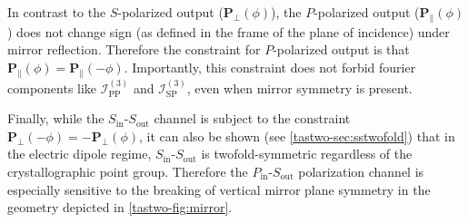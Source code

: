 \begin{table}
\caption[Indicators of broken mirror symmetry in RA-SHG]{Indicators of broken mirror symmetry in mirror-symmetry-breaking transitions between noncentrosymmetric point groups. Values in the rightmost column (defined in \cref{tastwo-eq:fourierdecomposition}) are zero in the initial group and nonzero in the final group. In all cases, the analysis was done in a geometry such that the sample normal is parallel to the broken mirror plane (i.e. the mirror plane is vertical).}
\label{tastwo-tab:indicators}
\end{table}

In contrast to the $S$-polarized output ($\bm{P}_\perp(\phi)$), the $P$-polarized output ($\bm{P}_\parallel(\phi)$) does not change sign (as defined in the frame of the plane of incidence) under mirror reflection.
Therefore the constraint for $P$-polarized output is that $\bm{P}_\parallel(\phi) = \bm{P}_\parallel(-\phi)$.
Importantly, this constraint does not forbid fourier components like $\mathscr{I}_\mathrm{PP}^{(3)}$ and $\mathscr{I}_\mathrm{SP}^{(3)}$, even when mirror symmetry is present.

Finally, while the $S_\mathrm{in}$-$S_\mathrm{out}$ channel is subject to the constraint $\bm{P}_\perp(-\phi) = -\bm{P}_\perp(\phi)$, it can also be shown (see \cref{tastwo-sec:sstwofold}) that in the electric dipole regime, $S_\mathrm{in}$-$S_\mathrm{out}$ is twofold-symmetric regardless of the crystallographic point group.
Therefore the $P_\mathrm{in}$-$S_\mathrm{out}$ polarization channel is especially sensitive to the breaking of vertical mirror plane symmetry in the geometry depicted in \cref{tastwo-fig:mirror}.

